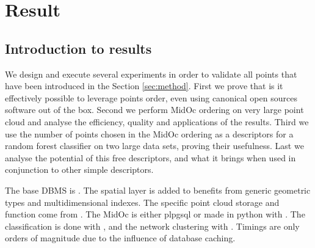 

 \section{ Result }
	 \label{sec:result}
 	\subsection{Introduction to results}
 		We design and execute several experiments in order to validate all points that have been introduced in the Section \ref{sec:method}.
 		First we prove that is it effectively possible to leverage points order, even using canonical open sources software out of the box.
 		Second we perform MidOc ordering on very large point cloud and analyse the efficiency, quality and applications of the results.
 		Third we use the number of points chosen in the MidOc ordering as a descriptors for a random forest classifier on two large data sets, proving their usefulness.
 		Last we analyse the potential of this free descriptors, and what it brings when used in conjunction to other simple descriptors.
 		
 		The base DBMS is \cite{PostgreSQL2014}. The spatial layer \cite{PostGIS2014} is added to benefits from generic geometric types and multidimensional indexes. The specific point cloud storage and function come from \cite{pgPointCloud2014}. 
 		The MidOc is either plpgsql or made in python with \cite{SciPy2014}. 
 		The classification is done with \cite{scikit-image}, and the network clustering with \cite{Networkx2014}.
 		Timings are only orders of magnitude due to the influence of database caching.
 	
	 
